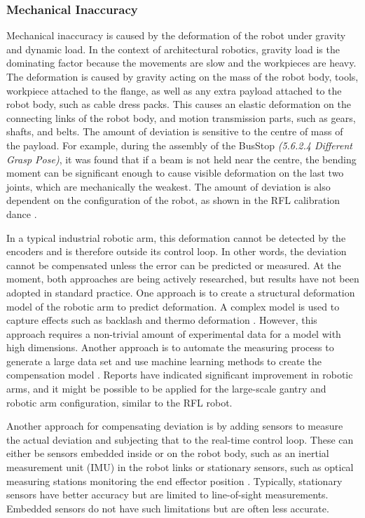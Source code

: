 \subsubsection{Mechanical Inaccuracy}
\label{subsubsection:new_hypo_mechanical_inaccuracy}

Mechanical inaccuracy is caused by the deformation of the robot under gravity and dynamic load. In the context of architectural robotics, gravity load is the dominating factor because the movements are slow and the workpieces are heavy. The deformation is caused by gravity acting on the mass of the robot body, tools, workpiece attached to the flange, as well as any extra payload attached to the robot body, such as cable dress packs. This causes an elastic deformation on the connecting links of the robot body, and motion transmission parts, such as gears, shafts, and belts. The amount of deviation is sensitive to the centre of mass of the payload. For example, during the assembly of the BusStop\textit{ (5.6.2.4 Different Grasp Pose)}, it was found that if a beam is not held near the centre, the bending moment can be significant enough to cause visible deformation on the last two joints, which are mechanically the weakest. The amount of deviation is also dependent on the configuration of the robot, as shown in the RFL calibration dance .

In a typical industrial robotic arm, this deformation cannot be detected by the encoders and is therefore outside its control loop. In other words, the deviation cannot be compensated unless the error can be predicted or measured. At the moment, both approaches are being actively researched, but results have not been adopted in standard practice. One approach is to create a structural deformation model of the robotic arm to predict deformation. A complex model is used to capture effects such as backlash and thermo deformation \parencite{wuReviewIndustrialRobot2022}. However, this approach requires a non-trivial amount of experimental data for a model with high dimensions. Another approach is to automate the measuring process to generate a large data set and use machine learning methods to create the compensation model \parencite{yeHighaccuracyPredictionCompensation2022}. Reports have indicated significant improvement in robotic arms, and it might be possible to be applied for the large-scale gantry and robotic arm configuration, similar to the RFL robot.

Another approach for compensating deviation is by adding sensors to measure the actual deviation and subjecting that to the real-time control loop. These can either be sensors embedded inside or on the robot body, such as an inertial measurement unit (IMU) in the robot links \parencite{judHEAPAutonomousWalking2021} or stationary sensors, such as optical measuring stations monitoring the end effector position \parencite{stadelmannEndEffectorPoseCorrection2019}. Typically, stationary sensors have better accuracy but are limited to line-of-sight measurements. Embedded sensors do not have such limitations but are often less accurate. 

